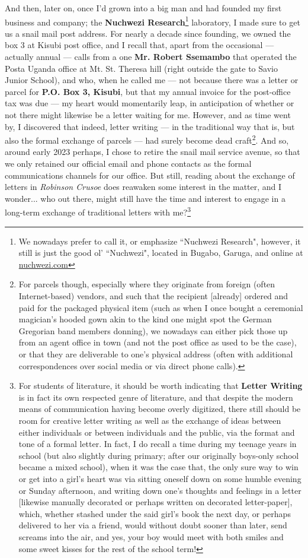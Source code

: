 \documentclass[a4paper]{article}
\begin{document}
And then, later on, once I'd grown into a big man and had founded my first business and company; the \textbf{Nuchwezi Research}\footnote{We nowadays prefer to call it, or emphasize ``Nuchwezi Research", however, it still is just the good ol' ``Nuchwezi", located in Bugabo, Garuga, and online at \url{nuchwezi.com}} laboratory, I made sure to get us a snail mail post address. For nearly a decade since founding, we owned the box 3 at Kisubi post office, and I recall that, apart from the occasional --- actually annual --- calls from a one \textbf{Mr. Robert Ssemambo} that operated the Posta Uganda office at Mt. St. Theresa hill (right outside the gate to Savio Junior School), and who, when he called me --- not because there was a letter or parcel for \textbf{P.O. Box 3, Kisubi}, but that my annual invoice for the post-office tax was due --- my heart would momentarily leap, in anticipation of whether or not there might likewise be a letter waiting for me. However, and as time went by, I discovered that indeed, letter writing --- in the traditional way that is, but also the formal exchange of parcels --- had surely become dead craft\footnote{For parcels though, especially where they originate from foreign (often Internet-based) vendors, and such that the recipient [already] ordered and paid for the packaged physical item (such as when I once bought a ceremonial magician's hooded gown akin to the kind one might spot the German Gregorian band members donning), we nowadays can either pick those up from an agent office in town (and not the post office as used to be the case), or that they are deliverable to one's physical address (often with additional correspondences over social media or via direct phone calls).}. And so, around early 2023 perhaps, I chose to retire the snail mail service avenue, so that we only retained our official email and phone contacts as the formal communications channels for our office. But still, reading about the exchange of letters in \textit{Robinson Crusoe} does reawaken some interest in the matter, and I wonder... who out there, might still have the time and interest to engage in a long-term exchange of traditional letters with me?\footnote{For students of literature, it should be worth indicating that \textbf{Letter Writing} is in fact its own respected genre of literature, and that despite the modern means of communication having become overly digitized, there still should be room for creative letter writing as well as the exchange of ideas between either individuals or between individuals and the public, via the format and tone of a formal letter. In fact, I do recall a time during my teenage years in school (but also slightly during primary; after our originally boys-only school became a mixed school), when it was the case that, the only sure way to win or get into a girl's heart was via sitting oneself down on some humble evening or Sunday afternoon, and writing down one's thoughts and feelings in a letter [likewise manually decorated or perhaps written on decorated letter-paper], which, whether stashed under the said girl's book the next day, or perhaps delivered to her via a friend, would without doubt sooner than later, send screams into the air, and yes, your boy would meet with both smiles and some sweet kisses for the rest of the school term!} 
  
\end{document}
